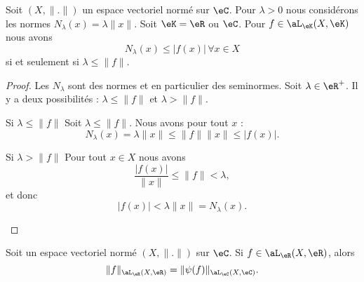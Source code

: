 \begin{corollary}        \label{CORooZEKAooENCDNJ}
    Soit \( (X,\| . \|)\) un espace vectoriel normé sur \( \eC\). Pour \( \lambda>0\) nous considérons les normes \( N_{\lambda}(x)=\lambda\| x \|\). Soit \( \eK=\eR\) ou \( \eC\). Pour \( f\in\aL_{\eK}(X,\eK)\) nous avons
    \begin{equation}
        N_{\lambda}(x)\leq | f(x) |\,\forall x\in X
    \end{equation}
    si et seulement si \( \lambda\leq \| f \|\).
\end{corollary}

\begin{proof}
    Les \( N_{\lambda}\) sont des normes et en particulier des seminormes.  Soit \( \lambda\in \eR^+\). Il y a deux possibilités : \( \lambda\leq \| f \|\) et \( \lambda > \| f \|\).
    \begin{subproof}
        \item[Si \( \lambda\leq \| f \|\)]
            Soit \( \lambda\leq \| f \|\). Nous avons pour tout \( x\) :
            \begin{equation}
                N_{\lambda}(x)=\lambda\| x \|\leq \| f \|\| x \|\leq | f(x) |.
            \end{equation}
        \item[Si \( \lambda>\| f \|\)]
            Pour tout \( x\in X\) nous avons
            \begin{equation}
                \frac{ | f(x) | }{ \| x \| }\leq \| f \|<\lambda,
            \end{equation}
            et donc
            \begin{equation}
                | f(x) |<\lambda\| x \|=N_{\lambda}(x).
            \end{equation}
    \end{subproof}
\end{proof}

\begin{proposition}       \label{PROPooGNFHooVkuizI}
    Soit un espace vectoriel normé \( (X,\| . \|)\) sur \( \eC\). Si \( f\in \aL_{\eR}(X,\eR)\), alors
    \begin{equation}
        \| f \|_{\aL_{\eR}(X,\eR)}=\| \psi(f) \|_{\aL_{\eC}(X,\eC)}.
    \end{equation}
\end{proposition}

